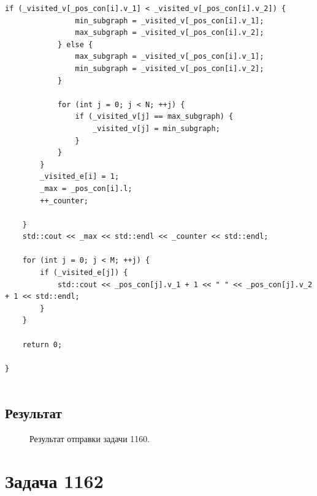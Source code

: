 \documentclass[a5paper, 10pt]{article}
\theoremstyle{definition}
\theoremstyle{plain}
\theoremstyle{remark}
\begin{document}
\begin{center}
\begin{lstlisting}[label=some-code,caption={Исходный код для 1160}]
            if (_visited_v[_pos_con[i].v_1] < _visited_v[_pos_con[i].v_2]) {
                min_subgraph = _visited_v[_pos_con[i].v_1];
                max_subgraph = _visited_v[_pos_con[i].v_2];
            } else {
                max_subgraph = _visited_v[_pos_con[i].v_1];
                min_subgraph = _visited_v[_pos_con[i].v_2];
            }

            for (int j = 0; j < N; ++j) {
                if (_visited_v[j] == max_subgraph) {
                    _visited_v[j] = min_subgraph;
                }
            }
        }
        _visited_e[i] = 1;
        _max = _pos_con[i].l;
        ++_counter;

    }
    std::cout << _max << std::endl << _counter << std::endl;

    for (int j = 0; j < M; ++j) {
        if (_visited_e[j]) {
            std::cout << _pos_con[j].v_1 + 1 << " " << _pos_con[j].v_2 + 1 << std::endl;
        }
    }

    return 0;

}


\end{lstlisting}
\end{center}

\subsection{Результат}
\begin{figure}[h]
\caption{Результат отправки задачи 1160.}
\end{figure}




\newpage
\section{Задача 1162}
\end{document}
